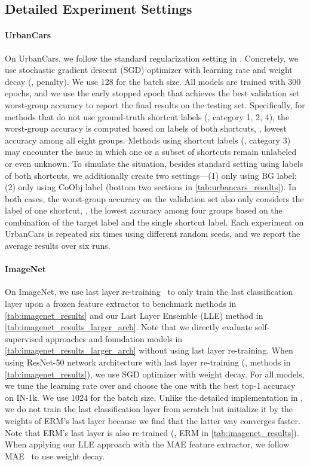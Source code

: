 \documentclass[10pt,twocolumn,letterpaper]{article}
\begin{document}
\subsection{Detailed Experiment Settings}
\label{appx:subsec:detailed_exp_setting}

\paragraph{UrbanCars} On UrbanCars, we follow the standard regularization setting in \cite{sagawa2020Int.Conf.Learn.Represent.Distributionally}. Concretely, we use stochastic gradient descent (SGD) optimizer with  learning rate and  weight decay (\ie,  penalty). We use 128 for the batch size. All models are trained with 300 epochs, and we use the early stopped epoch that achieves the best validation set worst-group accuracy to report the final results on the testing set. Specifically, for methods that do not use ground-truth shortcut labels (\ie, category 1, 2, 4), the worst-group accuracy is computed based on labels of both shortcuts, \ie, lowest accuracy among all eight groups. Methods using shortcut labels (\ie, category 3) may encounter the issue in which one or a subset of shortcuts remain unlabeled or even unknown. To simulate the situation, besides standard setting using labels of both shortcuts, we additionally create two settings---(1) only using BG label; (2) only using CoObj label (\cf bottom two sections in \cref{tab:urbancars_results}). In both cases, the worst-group accuracy on the validation set also only considers the label of one shortcut, \ie, the lowest accuracy among four groups based on the combination of the target label and the single shortcut label. Each experiment on UrbanCars is repeated six times using different random seeds, and we report the average results over six runs.

\paragraph{ImageNet} On ImageNet, we use last layer re-training~\cite{kirichenko2022Last} to only train the last classification layer upon a frozen feature extractor to benchmark methods in \cref{tab:imagenet_results} and our Last Layer Ensemble (LLE) method in
\cref{tab:imagenet_results_larger_arch}. Note that we directly evaluate self-supervised approaches and foundation models in \cref{tab:imagenet_results_larger_arch} without using last layer re-training. When using ResNet-50 network architecture with last layer re-training (\ie, methods in \cref{tab:imagenet_results}), we use SGD optimizer with  weight decay. For all models, we tune the learning rate over  and choose the one with the best top-1 accuracy on IN-1k. We use 1024 for the batch size. Unlike the detailed implementation in \cite{kirichenko2022Last}, we do not train the last classification layer from scratch but initialize it by the weights of ERM's last layer because we find that the latter way converges faster. Note that ERM's last layer is also re-trained (\eg, ERM in \cref{tab:imagenet_results}). When applying our LLE approach with the MAE feature extractor, we follow MAE~\cite{he2022IEEECVFConf.Comput.Vis.PatternRecognit.CVPRMasked} to use  weight decay.
\end{document}

